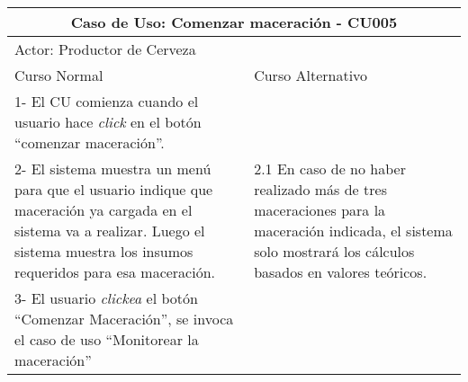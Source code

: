     
    \begin{minipage}{0.95\textwidth}
    \begin{center}
    \begin{tabularx}{\textwidth}{ | X | X |}
        \hline
        \multicolumn{2}{|c|}{\textbf{Caso de Uso: Comenzar maceración - CU005}} \\
        \hline
        \multicolumn{2}{|l|}{Actor: Productor de Cerveza} \\
        \hline
        Curso Normal & Curso Alternativo \\
        \hline
        1- El CU comienza cuando el usuario hace \textit{click} en el botón “comenzar maceración”. & \\
        \hline
        2- El sistema muestra un menú para que el usuario indique que maceración ya cargada en el sistema va a realizar. Luego el sistema muestra los insumos requeridos para esa maceración. & 2.1 En caso de no haber realizado más de tres maceraciones para la maceración indicada, el sistema solo mostrará los cálculos basados en valores teóricos.
        \\
        \hline
        3- El usuario \textit{clickea} el botón “Comenzar Maceración”, se invoca el caso de uso “Monitorear la maceración” & 
        \\
        \hline
    \end{tabularx}
    \label{CU005}
    \end{center}
    \end{minipage}
    
